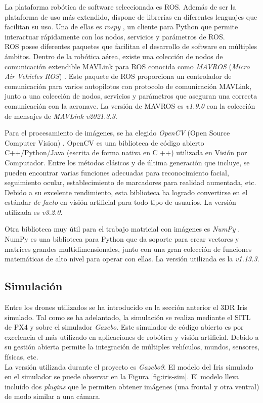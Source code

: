 \documentclass[../main.tex]{subfiles}
\begin{document}
La plataforma robótica de software seleccionada es ROS. Además de ser la plataforma de uso más extendido, dispone de librerías en diferentes lenguajes que facilitan su uso. Una de ellas es \emph{rospy} \cite{rospy}, un cliente para Python que permite interactuar rápidamente con los nodos, servicios y parámetros de ROS. \\
ROS posee diferentes paquetes que facilitan el desarrollo de software en múltiples ámbitos. Dentro de la robótica aérea, existe una colección de nodos de comunicación extendible MAVLink para ROS conocida como \textit{MAVROS} (\emph{Micro Air Vehicles ROS}) \cite{mavros}. Este paquete de ROS proporciona un controlador de comunicación para varios autopilotos con protocolo de comunicación MAVLink, junto a una colección de nodos, servicios y parámetros que aseguran una correcta comunicación con la aeronave. La versión de MAVROS es \textit{v1.9.0} con la colección de mensajes de \textit{MAVLink v2021.3.3}.

\newpage
Para el procesamiento de imágenes, se ha elegido \textit{OpenCV} (Open Source Computer Vision) \cite{opencv}. OpenCV es una biblioteca de código abierto C++/Python/Java (escrita de forma nativa en C ++) utilizada en Visión por Computador. Entre los métodos clásicos y de última generación que incluye, se pueden encontrar varias funciones adecuadas para reconocimiento facial, seguimiento ocular, establecimiento de marcadores para realidad aumentada, etc. Debido a su excelente rendimiento, esta biblioteca ha logrado convertirse en el estándar \emph{de facto} en visión artificial para todo tipo de usuarios. La versión utilizada es \textit{v3.2.0}.

Otra biblioteca muy útil para el trabajo matricial con imágenes es \textit{NumPy} \cite{numpy}. NumPy es una biblioteca para Python que da soporte para crear vectores y matrices grandes multidimensionales, junto con una gran colección de funciones matemáticas de alto nivel para operar con ellas. La versión utilizada es la \textit{v1.13.3}.

\subsection{Simulación} \label{section:met-sim}
Entre los drones utilizados se ha introducido en la sección anterior el 3DR Iris simulado. Tal como se ha adelantado, la simulación se realiza mediante el SITL de PX4 y sobre el simulador \emph{Gazebo}. Este simulador de código abierto es por excelencia el más utilizado en aplicaciones de robótica y visión artificial. Debido a su gestión abierta permite la integración de múltiples vehículos, mundos, sensores, físicas, etc. \\
La versión utilizada durante el proyecto es \textit{Gazebo9}. El modelo del Iris simulado en el simulador se puede observar en la Figura \ref{fig:iris-sim}. El modelo lleva incluído dos \emph{plugins} que le permiten obtener imágenes (una frontal y otra ventral) de modo similar a una cámara.
\end{document}

